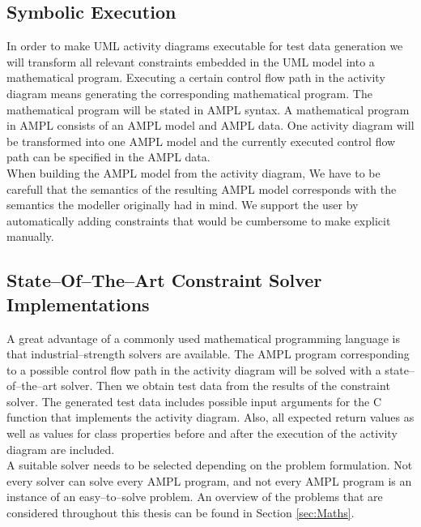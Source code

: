 \subsection{Symbolic Execution}
In order to make UML activity diagrams executable for test data generation we will transform all relevant constraints embedded in the UML model into a mathematical program. Executing a certain control flow path in the activity diagram means generating the corresponding mathematical program. The mathematical program will be stated in AMPL syntax. A mathematical program in AMPL consists of an AMPL model and AMPL data. One activity diagram will be transformed into one AMPL model and the currently executed control flow path can be specified in the AMPL data.\\
When building the AMPL model from the activity diagram, We have to be carefull that the semantics of the resulting AMPL model corresponds with the semantics the modeller originally had in mind. We support the user by automatically adding constraints that would be cumbersome to make explicit manually.
\subsection{State--Of--The--Art Constraint Solver Implementations} 
A great advantage of a commonly used mathematical programming language is that industrial--strength solvers are available. The AMPL program corresponding to a possible control flow path in the activity diagram will be solved with a state--of--the--art solver. Then we obtain test data from the results of the constraint solver. The generated test data includes possible input arguments for the C function that implements the activity diagram. Also, all expected return values as well as values for class properties before and after the execution of the activity diagram are included.\\
A suitable solver needs to be selected depending on the problem formulation. Not every solver can solve every AMPL program, and not every AMPL program is an instance of an easy--to--solve problem. An overview of the problems that are considered throughout this thesis can be found in Section \ref{sec:Maths}.
